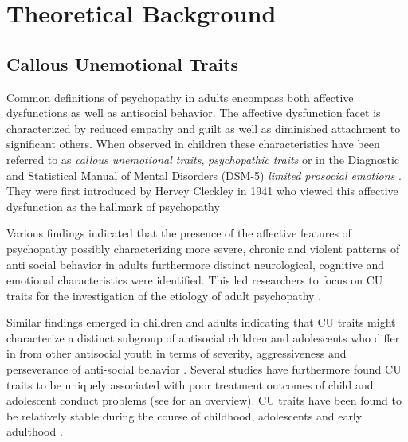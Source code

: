 


\section{Theoretical Background}
\subsection{Callous Unemotional Traits}
Common definitions of psychopathy in adults encompass both affective dysfunctions as well as antisocial behavior.
The affective dysfunction facet is characterized by reduced empathy and guilt as well as diminished attachment to significant others.
When observed in children these characteristics have been referred to as \textit{callous unemotional traits}, \textit{psychopathic traits} or in the Diagnostic and Statistical Manual of Mental Disorders (DSM-5)
\textit{limited prosocial emotions} \parencite{viding_callousunemotional_2018}. They were first introduced by Hervey Cleckley in 1941 who viewed this affective dysfunction as the hallmark of psychopathy \parencite{cleckley_mask_1941}

Various findings indicated that the presence of the affective features of psychopathy possibly characterizing more severe,
chronic and violent patterns of anti social behavior in adults \parencite{leistico_large-scale_2008} furthermore distinct neurological, 
cognitive and emotional characteristics \parencite{blair_neurobiology_2013, frick_psychopathy_2018} were identified.
This led researchers to focus on CU traits for the investigation of the etiology of adult psychopathy \parencite{frick_evaluating_2015}.

Similar findings emerged in children and adults indicating that CU traits might characterize a distinct subgroup of antisocial children and adolescents
who differ in from other antisocial youth in terms of severity, aggressiveness and perseverance of anti-social behavior \parencite{frick_psychopathy_2018}.
Several studies have furthermore found CU traits to be uniquely associated with poor treatment outcomes of child and adolescent conduct problems (see \cite{hawes_callous-unemotional_2014} for an overview).
CU traits have been found to be relatively stable during the course of childhood, adolescents and early adulthood \parencite{obradovic_measuring_2007, loney_adolescent_2007}.

